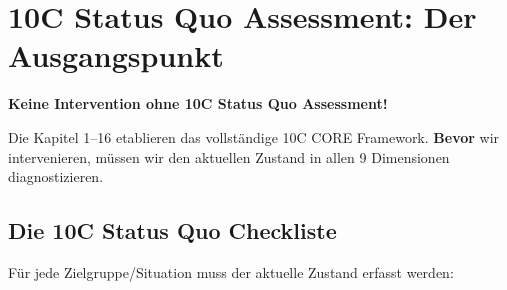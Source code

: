 
\section{10C Status Quo Assessment: Der Ausgangspunkt}
\label{sec:17-status-quo}

\begin{tcolorbox}[colback=blue!5!white, colframe=blue!75!black,
    title=\textbf{KRITISCH: Diagnose VOR Intervention}]
\textbf{Keine Intervention ohne 10C Status Quo Assessment!}

Die Kapitel 1--16 etablieren das vollst\"{a}ndige 10C CORE Framework. \textbf{Bevor} wir intervenieren, m\"{u}ssen wir den aktuellen Zustand in allen 9 Dimensionen diagnostizieren.
\end{tcolorbox}

\subsection{Die 10C Status Quo Checkliste}
\label{sec:17-checklist}

F\"{u}r jede Zielgruppe/Situation muss der aktuelle Zustand erfasst werden:

